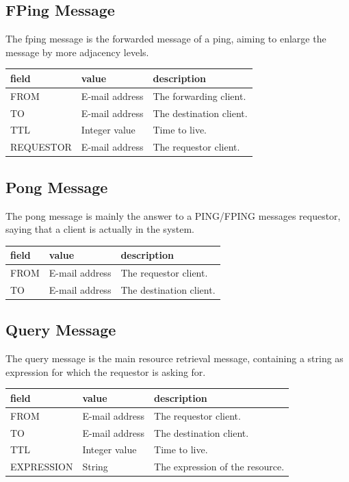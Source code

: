 \documentclass{article}
\begin{document}
\subsection{FPing Message}
The fping message is the forwarded message of a ping, aiming to enlarge the
message by more adjacency levels.
\newline
\noindent
\begin{tabular}{|lll|} 
\hline
field & value & description \\
\hline 
FROM & E-mail address & The forwarding client. \\
TO & E-mail address & The destination client. \\
TTL & Integer value & Time to live. \\
REQUESTOR & E-mail address & The requestor client. \\
\hline 
\end{tabular}

\subsection{Pong Message}
The pong message is mainly the answer to a PING/FPING messages requestor,
saying that a client is actually in the system.
\newline
\noindent
\begin{tabular}{|lll|} 
\hline
field & value & description \\
\hline 
FROM & E-mail address & The requestor client. \\
TO & E-mail address & The destination client. \\
\hline 
\end{tabular}

\subsection{Query Message}
The query message is the main resource retrieval message, containing a string
as expression for which the requestor is asking for.
\newline
\noindent
\begin{tabular}{|lll|} 
\hline
field & value & description \\
\hline 
FROM & E-mail address & The requestor client. \\
TO & E-mail address & The destination client. \\
TTL & Integer value & Time to live. \\
EXPRESSION & String & The expression of the resource. \\
\hline 
\end{tabular}
\end{document}
